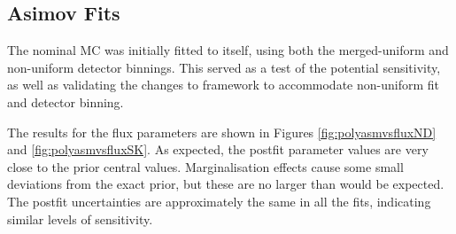 \subsection{Asimov Fits}

The nominal MC was initially fitted to itself, using both the merged-uniform and non-uniform detector binnings. This served as a test of the potential sensitivity, as well as validating the changes to framework to accommodate non-uniform fit and detector binning. 

The results for the flux parameters are shown in Figures \ref{fig:polyasmvsfluxND} and \ref{fig:polyasmvsfluxSK}. As expected, the postfit parameter values are very close to the prior central values. Marginalisation effects cause some small deviations from the exact prior, but these are no larger than would be expected. The postfit uncertainties are approximately the same in all the fits, indicating similar levels of sensitivity.


